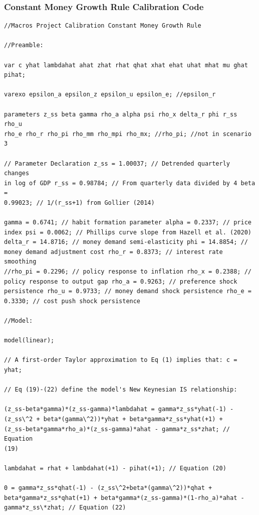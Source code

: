 \documentclass[11pt,preprint, authoryear]{elsarticle}
\numberwithin{equation}{section}
\numberwithin{figure}{section}
\numberwithin{table}{section}
\begin{document}
\hypertarget{constant-money-growth-rule-calibration-code}{%
\subsubsection{Constant Money Growth Rule Calibration
Code}\label{constant-money-growth-rule-calibration-code}}

\begin{verbatim}
//Macros Project Calibration Constant Money Growth Rule

//Preamble:

var c yhat lambdahat ahat zhat rhat qhat xhat ehat uhat mhat mu ghat
pihat;

varexo epsilon_a epsilon_z epsilon_u epsilon_e; //epsilon_r

parameters z_ss beta gamma rho_a alpha psi rho_x delta_r phi r_ss rho_u
rho_e rho_r rho_pi rho_mm rho_mpi rho_mx; //rho_pi; //not in scenario 3

// Parameter Declaration z_ss = 1.00037; // Detrended quarterly changes
in log of GDP r_ss = 0.98784; // From quarterly data divided by 4 beta =
0.99023; // 1/(r_ss+1) from Gollier (2014)

gamma = 0.6741; // habit formation parameter alpha = 0.2337; // price
index psi = 0.0062; // Phillips curve slope from Hazell et al. (2020)
delta_r = 14.8716; // money demand semi-elasticity phi = 14.8854; //
money demand adjustment cost rho_r = 0.8373; // interest rate smoothing
//rho_pi = 0.2296; // policy response to inflation rho_x = 0.2388; //
policy response to output gap rho_a = 0.9263; // preference shock
persistence rho_u = 0.9733; // money demand shock persistence rho_e =
0.3330; // cost push shock persistence

//Model:

model(linear);

// A first-order Taylor approximation to Eq (1) implies that: c = yhat;

// Eq (19)-(22) define the model's New Keynesian IS relationship:

(z_ss-beta*gamma)*(z_ss-gamma)*lambdahat = gamma*z_ss*yhat(-1) -
(z_ss\^2 + beta*(gamma\^2))*yhat + beta*gamma*z_ss*yhat(+1) +
(z_ss-beta*gamma*rho_a)*(z_ss-gamma)*ahat - gamma*z_ss*zhat; // Equation
(19)

lambdahat = rhat + lambdahat(+1) - pihat(+1); // Equation (20)

0 = gamma*z_ss*qhat(-1) - (z_ss\^2+beta*(gamma\^2))*qhat +
beta*gamma*z_ss*qhat(+1) + beta*gamma*(z_ss-gamma)*(1-rho_a)*ahat -
gamma*z_ss\*zhat; // Equation (22)


\end{verbatim}
\end{document}
